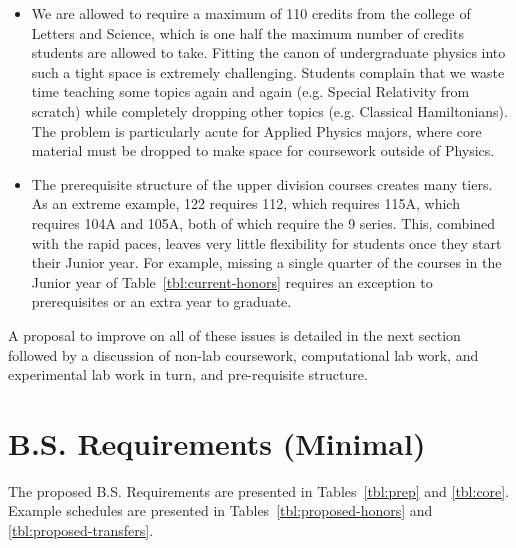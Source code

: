 \documentclass[12pt]{article}
\begin{document}
\begin{itemize}
\item We are allowed to require a maximum of 110 credits from the college of Letters and Science, which is one half the maximum number of credits students are allowed to take.  Fitting the canon of undergraduate physics into such a tight space is extremely challenging.  Students complain that we waste time teaching some topics again and again (e.g. Special Relativity from scratch) while completely dropping other topics (e.g. Classical Hamiltonians).  The problem is particularly acute for Applied Physics majors, where core material must be dropped to make space for coursework outside of Physics.

\item The prerequisite structure of the upper division courses creates many tiers.  
As an extreme example, 122 requires 112, which requires 115A, which requires 104A and 105A, both of which require the 9 series.  This, combined with the rapid paces, leaves very little flexibility for students once they start their Junior year.  For example, missing a single quarter of the courses in the Junior year of Table~\ref{tbl:current-honors} requires an exception to prerequisites or an extra year to graduate.

\label{tbl:current-honors}

\end{itemize}

A proposal to improve on all of these issues is detailed in the next section followed by a discussion of non-lab coursework, computational lab work, and experimental lab work in turn, and pre-requisite structure.
\newpage

\section{B.S. Requirements (Minimal)}

The proposed B.S. Requirements are presented in Tables~\ref{tbl:prep} and \ref{tbl:core}.  Example schedules are presented in Tables~\ref{tbl:proposed-honors} and \ref{tbl:proposed-transfers}.
\end{document}
